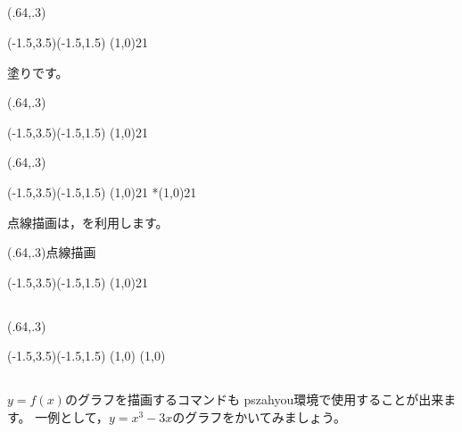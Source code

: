 \documentclass[a4j]{jarticle}
\begin{document}
\subsection{\texorpdfstring{}{Daen}}

\begin{showEx}(.64,.3){}
\begin{pszahyou}[ul=5mm](-1.5,3.5)(-1.5,1.5)
  \def\A{(1,0)}
  \Daen\A{2}{1}
\end{pszahyou}
\end{showEx}

塗りです。

\begin{showEx}(.64,.3){}
\begin{pszahyou}[ul=5mm](-1.5,3.5)(-1.5,1.5)
  \def\A{(1,0)}
  \Daen*\A{2}{1}
\end{pszahyou}
\end{showEx}

\begin{showEx}(.64,.3){}
\begin{pszahyou}[ul=5mm](-1.5,3.5)(-1.5,1.5)
  \def\A{(1,0)}
  \Daen\A{2}{1}
  \Daen**\A{2}{1}
\end{pszahyou}
\end{showEx}

点線描画は，を利用します。

\begin{showEx}(.64,.3){点線描画}
\begin{pszahyou}[ul=5mm](-1.5,3.5)(-1.5,1.5)
  \def\A{(1,0)}
  \Daen\A{2}{1}
  \setdash{}
\end{pszahyou}
\end{showEx}

\subsection{\texorpdfstring{}{Daenko}}

\begin{showEx}(.64,.3){}
\begin{pszahyou}[ul=5mm](-1.5,3.5)(-1.5,1.5)
  \def\A{(1,0)}
  \Put\A{}
  \Put\A{}
  \setdash{}
\end{pszahyou}
\end{showEx}

\subsection{\texorpdfstring{}{YGurafu}}
$y=f(x)$のグラフを描画するコマンドも
\textsf{pszahyou}環境で使用することが出来ます。
一例として，$y=x^3-3x$のグラフをかいてみましょう。
\end{document}
